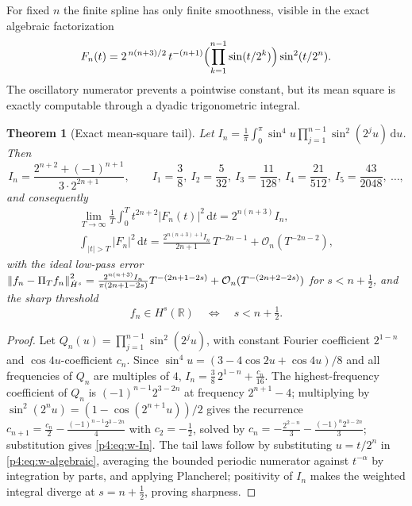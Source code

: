 \documentclass[11pt,oneside]{article}
\numberwithin{equation}{section}
\newtheorem{theorem}{Theorem}[section]
\theoremstyle{definition}
\theoremstyle{remark}
\newcommand{\R}{\mathbb R}
\newcommand{\dd}{\,\mathrm d}
\newcommand{\bigO}{\mathcal O}
\begin{document}
For fixed $n$ the finite spline has only finite smoothness, visible in the
exact algebraic factorization
\begin{equation}
 F_n(t)=2^{\,n(n+3)/2}\,t^{-(n+1)}
 \Bigl(\prod_{k=1}^{n-1}\sin(t/2^k)\Bigr)\sin^2(t/2^n).
 \label{p4:eq:w-algebraic}
\end{equation}
The oscillatory numerator prevents a pointwise constant, but its mean
square is exactly computable through a dyadic trigonometric integral.

\begin{theorem}[Exact mean-square tail]
\label{p4:thm:w-meansquare}
Let
$I_n=\frac1\pi\int_0^\pi\sin^4u\prod_{j=1}^{n-1}\sin^2(2^ju)\dd u$.  Then
\begin{equation}
 I_n=\frac{2^{n+2}+(-1)^{n+1}}{3\cdot2^{2n+1}},
 \qquad
 I_1=\frac38,\ I_2=\frac5{32},\ I_3=\frac{11}{128},\
 I_4=\frac{21}{512},\ I_5=\frac{43}{2048},\ \ldots,
 \label{p4:eq:w-In}
\end{equation}
and consequently
\begin{equation}
\begin{gathered}
 \lim_{T\to\infty}\frac1T\int_0^Tt^{2n+2}|F_n(t)|^2\dd t
 =2^{n(n+3)}I_n,\\
 \int_{|t|>T}|F_n|^2\dd t
 =\frac{2^{n(n+3)+1}I_n}{2n+1}\,T^{-2n-1}+\bigO_n(T^{-2n-2}),
\end{gathered}
 \label{p4:eq:w-tail-laws}
\end{equation}
with the ideal low-pass error
$\norm{f_n-\Pi_Tf_n}_{\dot H^s}^2
=\frac{2^{n(n+3)}I_n}{\pi(2n+1-2s)}T^{-(2n+1-2s)}+\bigO_n(T^{-(2n+2-2s)})$
for $s<n+\tfrac12$, and the sharp threshold
\begin{equation}
 f_n\in H^s(\R)\quad\Longleftrightarrow\quad s<n+\tfrac12.
 \label{p4:eq:w-Hs-threshold}
\end{equation}
\end{theorem}

\begin{proof}
Let $Q_n(u)=\prod_{j=1}^{n-1}\sin^2(2^ju)$, with constant Fourier
coefficient $2^{1-n}$ and $\cos4u$-coefficient $c_n$.  Since
$\sin^4u=(3-4\cos2u+\cos4u)/8$ and all frequencies of $Q_n$ are multiples
of $4$, $I_n=\tfrac38\,2^{1-n}+\tfrac{c_n}{16}$.  The highest-frequency
coefficient of $Q_n$ is $(-1)^{n-1}2^{3-2n}$ at frequency $2^{n+1}-4$;
multiplying by $\sin^2(2^nu)=(1-\cos(2^{n+1}u))/2$ gives the recurrence
$c_{n+1}=\tfrac{c_n}2-\tfrac{(-1)^{n-1}2^{3-2n}}4$ with $c_2=-\tfrac12$,
solved by $c_n=-\tfrac{2^{2-n}}3-\tfrac{(-1)^n2^{3-2n}}3$; substitution
gives \eqref{p4:eq:w-In}.  The tail laws follow by substituting $u=t/2^n$ in
\eqref{p4:eq:w-algebraic}, averaging the bounded periodic numerator against
$t^{-\alpha}$ by integration by parts, and applying Plancherel; positivity
of $I_n$ makes the weighted integral diverge at $s=n+\tfrac12$, proving
sharpness.
\end{proof}
\end{document}
